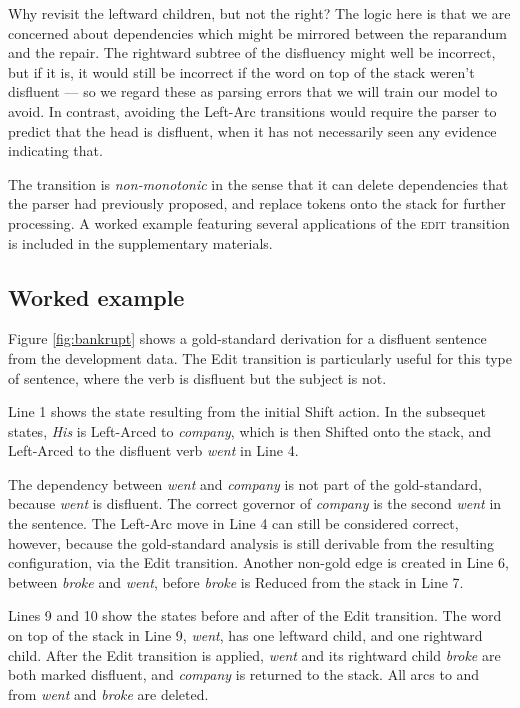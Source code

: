 \documentclass[11pt,letterpaper]{article}
\begin{document}
Why revisit the leftward children, but not the right? The logic here is that we
are concerned about dependencies which might be mirrored between the reparandum
and the repair. The rightward subtree of the disfluency might well be incorrect,
but if it is, it would still be incorrect if the word on top of the stack weren't
disfluent --– so we regard these as parsing errors that we will train our model
to avoid. In contrast, avoiding the Left-Arc transitions would require the parser to
predict that the head is disfluent, when it has not necessarily seen any evidence
indicating that.

The transition is \emph{non-monotonic} in the sense that it can delete dependencies
that the parser had previously proposed, and replace tokens onto the stack for
further processing. 
A worked example featuring several applications of the \textsc{edit} transition
is included in the supplementary materials.

\subsection{Worked example}

Figure \ref{fig:bankrupt} shows a gold-standard derivation for a disfluent sentence
from the development data.  The Edit transition is particularly useful for this
type of sentence, where the verb is disfluent but the subject is not.

Line 1 shows the state resulting from the initial Shift action.  In the subsequet
states, \emph{His} is Left-Arced to \emph{company}, which is then Shifted onto
the stack, and Left-Arced to the disfluent verb \emph{went} in Line 4.

The dependency between \emph{went} and \emph{company} is not part of the gold-standard,
because \emph{went} is disfluent.  The correct governor of \emph{company} is the
second \emph{went} in the sentence.  The Left-Arc move in Line 4 can still
be considered correct, however, because the gold-standard analysis is still
derivable from the resulting configuration, via the Edit transition.
Another non-gold edge is created in Line 6, between \emph{broke} and \emph{went},
before \emph{broke} is Reduced from the stack in Line 7.

Lines 9 and 10 show the states before and after of the Edit transition. The word
on top of the stack in Line 9, \emph{went}, has one leftward child, and one
rightward child.  After the Edit transition is applied, \emph{went} and its 
rightward child \emph{broke} are both marked disfluent, and \emph{company}
is returned to the stack.  All arcs to and from \emph{went} and \emph{broke}
are deleted.
\end{document}
